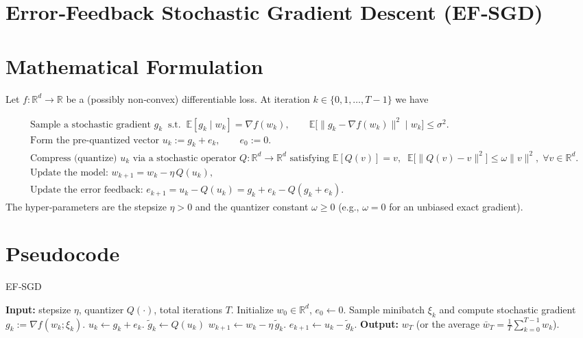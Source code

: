 \documentclass{article}
\newcommand{\EE}{\mathbb{E}}
\newcommand{\R}{\mathbb{R}}
\begin{document}
\section*{Error‑Feedback Stochastic Gradient Descent (EF‑SGD)}

\section*{Mathematical Formulation}
Let $f:\R^{d}\to\R$ be a (possibly non‑convex) differentiable loss.  
At iteration $k\in\{0,1,\dots,T-1\}$ we have

\begin{align}
    &\text{Sample a stochastic gradient } g_k\;\; \text{s.t.}\;\; 
    \EE[g_k\mid w_k]=\nabla f(w_k),\qquad 
    \EE\!\big[\|g_k-\nabla f(w_k)\|^{2}\mid w_k\big]\le\sigma^{2}. \label{eq:sgd}\\[4pt]
    &\text{Form the pre‑quantized vector } u_k:=g_k+e_k, \qquad e_0:=0. \tag{1}\\[4pt]
    &\text{Compress (quantize) } u_k \text{ via a stochastic operator } Q:\R^{d}\to\R^{d} 
    \text{ satisfying } \EE[Q(v)]=v,\;\;
    \EE\!\big[\|Q(v)-v\|^{2}\big]\le\omega\|v\|^{2},\;\forall v\in\R^{d}. \tag{2}\\[4pt]
    &\text{Update the model: } 
    w_{k+1}=w_k-\eta\, Q(u_k), \tag{3}\\[4pt]
    &\text{Update the error feedback: } 
    e_{k+1}=u_k-Q(u_k)=g_k+e_k-Q(g_k+e_k). \tag{4}
\end{align}
The hyper‑parameters are the stepsize $\eta>0$ and the quantizer constant $\omega\ge0$ (e.g., $\omega=0$ for an unbiased exact gradient).

\section*{Pseudocode}
\begin{algorithm}[H]
\caption{EF‑SGD}
\begin{algorithmic}[1]
\State \textbf{Input:} stepsize $\eta$, quantizer $Q(\cdot)$, total iterations $T$.
\State Initialize $w_{0}\in\R^{d}$, $e_{0}\gets 0$.
    \State Sample minibatch $\xi_k$ and compute stochastic gradient $g_k:=\nabla f(w_k;\xi_k)$.
    \State $u_k \gets g_k+e_k$.
    \State $\tilde g_k \gets Q(u_k)$ \hfill{}
    \State $w_{k+1} \gets w_k - \eta\,\tilde g_k$.
    \State $e_{k+1} \gets u_k - \tilde g_k$.
\EndFor
\State \textbf{Output:} $w_T$ (or the average $\bar w_T=\tfrac1T\sum_{k=0}^{T-1}w_k$).
\end{algorithmic}
\end{algorithm}
\end{document}
